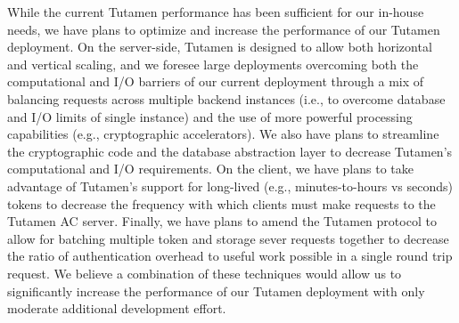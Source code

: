While the current Tutamen performance has been sufficient for our
in-house needs, we have plans to optimize and increase the performance
of our Tutamen deployment. On the server-side, Tutamen is designed to
allow both horizontal and vertical scaling, and we foresee large
deployments overcoming both the computational and I/O barriers of our
current deployment through a mix of balancing requests across multiple
backend instances (i.e., to overcome database and I/O limits of single
instance) and the use of more powerful processing capabilities (e.g.,
cryptographic accelerators). We also have plans to streamline the
cryptographic code and the database abstraction layer to decrease
Tutamen's computational and I/O requirements. On the client, we have
plans to take advantage of Tutamen's support for long-lived (e.g.,
minutes-to-hours vs seconds) tokens to decrease the frequency with
which clients must make requests to the Tutamen AC server. Finally, we
have plans to amend the Tutamen protocol to allow for batching
multiple token and storage sever requests together to decrease the
ratio of authentication overhead to useful work possible in a single
round trip request. We believe a combination of these techniques would
allow us to significantly increase the performance of our Tutamen
deployment with only moderate additional development effort.

